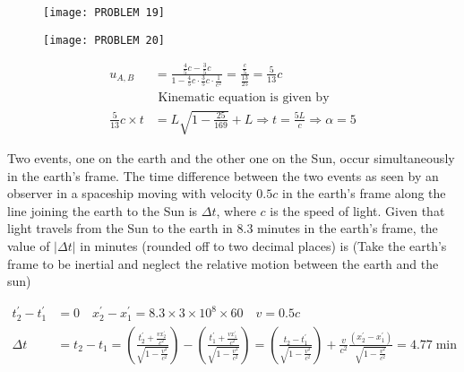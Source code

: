 \begin{enumerate}
\begin{minipage}{\textwidth}
\begin{minipage}{0.5\textwidth}
	\begin{figure}[H]
		\centering
		\texttt{[image: PROBLEM 19]}
	\end{figure}	
	\end{minipage}
\begin{minipage}{0.5\textwidth}
	\begin{figure}[H]
		\centering
		\texttt{[image: PROBLEM 20]}
	\end{figure}
\end{minipage}
\end{minipage}
\begin{answer}
	\begin{align*}
	u_{A, B}&=\frac{\frac{4}{5} c-\frac{3}{5} c}{1-\frac{4}{5} c \cdot \frac{3}{5} c \cdot \frac{1}{c^{2}}}=\frac{\frac{c}{5}}{\frac{13}{25}}=\frac{5}{13} c	\\
	&\text { Kinematic equation is given by }\\
	\frac{5}{13} c \times t&=L \sqrt{1-\frac{25}{169}}+L \Rightarrow t=\frac{5 L}{c} \Rightarrow \alpha=5
	\end{align*}
\end{answer}
\begin{minipage}{\textwidth}
	\item Two events, one on the earth and the other one on the Sun, occur simultaneously in the earth's frame. The time difference between the two events as seen by an observer in a spaceship moving with velocity $0.5 c$ in the earth's frame along the line joining the earth to the Sun is $\Delta t$, where $c$ is the speed of light. Given that light travels from the Sun to the earth in $8.3$ minutes in the earth's frame, the value of $|\Delta t|$ in minutes (rounded off to two decimal places) is
	(Take the earth's frame to be inertial and neglect the relative motion between the earth and the sun)
\end{minipage}
\begin{answer}
\begin{align*}
t_{2}^{\prime}-t_{1}^{\prime}&=0 \quad x_{2}^{\prime}-x_{1}^{\prime}=8.3 \times 3 \times 10^{8} \times 60 \quad v=0.5 c\\
\Delta t&=t_{2}-t_{1}=\left(\frac{t_{2}^{\prime}+\frac{v x_{2}^{\prime}}{c^{2}}}{\sqrt{1-\frac{v^{2}}{c^{2}}}}\right)-\left(\frac{t_{1}^{\prime}+\frac{v x_{1}^{\prime}}{c^{2}}}{\sqrt{1-\frac{v^{2}}{c^{2}}}}\right)=\left(\frac{t_{2}-t_{1}^{\prime}}{\sqrt{1-\frac{v^{2}}{c^{2}}}}\right)+\frac{v}{c^{2}} \frac{\left(x_{2}^{\prime}-x_{1}^{\prime}\right)}{\sqrt{1-\frac{v^{2}}{c^{2}}}}=4.77 \min
\end{align*}	
\end{answer}
\end{enumerate}